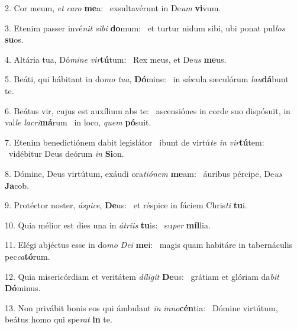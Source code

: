 2. Cor meum, \textit{et} \textit{ca}\textit{ro} \textbf{me}a: \ast\  exsultavérunt in De\textit{um} \textbf{vi}vum.\

3. Etenim passer invé\textit{nit} \textit{si}\textit{bi} \textbf{do}mum: \ast\  et turtur nidum sibi, ubi ponat pul\textit{los} \textbf{su}os.\

4. Altária tua, Dó\textit{mi}\textit{ne} \textit{vir}\textbf{tú}tum: \ast\  Rex meus, et De\textit{us} \textbf{me}us.\

5. Beáti, qui hábitant in do\textit{mo} \textit{tu}\textit{a}, \textbf{Dó}mine: \ast\  in sǽcula sæculórum \textit{lau}\textbf{dá}bunt te.\

6. Beátus vir, cujus est auxílium abs te: \dag\  ascensiónes in corde suo dispósuit, in val\textit{le} \textit{la}\textit{cri}\textbf{má}rum \ast\  in loco, \textit{quem} \textbf{pó}suit.\

7. Etenim benedictiónem dabit legislátor \dag\  ibunt de virtú\textit{te} \textit{in} \textit{vir}\textbf{tú}tem: \ast\  vidébitur Deus deórum \textit{in} \textbf{Si}on.\

8. Dómine, Deus virtútum, exáudi ora\textit{ti}\textit{ó}\textit{nem} \textbf{me}am: \ast\  áuribus pércipe, De\textit{us} \textbf{Ja}cob.\

9. Protéctor noster, \textit{á}\textit{spi}\textit{ce}, \textbf{De}us: \ast\  et réspice in fáciem Chris\textit{ti} \textbf{tu}i.\

10. Quia mélior est dies una in \textit{á}\textit{tri}\textit{is} \textbf{tu}is: \ast\  su\textit{per} \textbf{míl}lia.\

11. Elégi abjéctus esse in do\textit{mo} \textit{De}\textit{i} \textbf{me}i: \ast\  magis quam habitáre in tabernáculis pec\textit{ca}\textbf{tó}rum.\

12. Quia misericórdiam et veritátem \textit{dí}\textit{li}\textit{git} \textbf{De}us: \ast\  grátiam et glóriam da\textit{bit} \textbf{Dó}minus.\

13. Non privábit bonis eos qui ámbulant \textit{in} \textit{in}\textit{no}\textbf{cén}tia: \ast\  Dómine virtútum, beátus homo qui spe\textit{rat} \textbf{in} te.\


